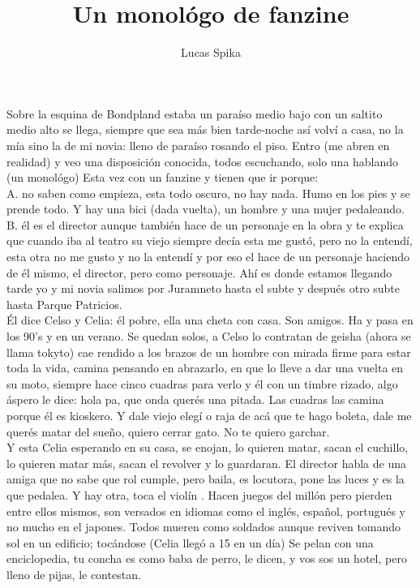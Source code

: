 \documentclass{article}
\title{Un monológo de fanzine}
\date{}
\author{Lucas Spika}
\begin{document}

Sobre la esquina de Bondpland estaba un paraíso medio bajo con un saltito medio alto se llega, siempre que sea más bien tarde-noche así volví a casa, no la mía sino la de mi novia: lleno de paraíso rosando el piso. Entro (me abren en realidad) y veo una disposición conocida, todos escuchando, solo una hablando (un monológo) Esta vez con un fanzine y tienen que ir porque:\\
A. no saben como empieza, esta todo oscuro, no hay nada. Humo  en los pies y se prende todo. Y hay una bici (dada vuelta), un hombre y una mujer pedaleando.\\
B. él es el director aunque también hace de un personaje en la obra y te explica que cuando iba al teatro su viejo siempre decía esta me gustó, pero no la entendí, esta otra no me gusto y no la entendí y por eso el hace de un personaje haciendo de él mismo, el director, pero como personaje. 
Ahí es donde estamos llegando tarde yo y mi novia salimos por Juramneto hasta el subte y después otro subte hasta Parque Patricios.
\\

Él dice Celso y Celia: él pobre, ella una cheta con casa. Son amigos. Ha y pasa en los 90’s y en un verano. Se quedan solos, a Celso lo contratan de geisha (ahora se llama tokyto) cae rendido a los brazos de un hombre con mirada firme para estar toda la vida, camina pensando en abrazarlo, en que lo lleve a dar una vuelta en su moto, siempre hace cinco cuadras para verlo y él con un timbre rizado, algo áspero le dice: hola pa, que onda querés una pitada. Las cuadras las camina porque él es  kioskero. Y dale viejo elegí o raja de acá que te hago boleta, dale me querés matar del sueño, quiero cerrar gato. No te quiero garchar. 
\\

Y esta Celia esperando en su casa, se enojan, lo quieren matar, sacan el cuchillo, lo quieren matar más, sacan el revolver y lo guardaran. El director habla de una amiga que no sabe que rol cumple, pero baila, es locutora, pone las luces y es la que pedalea. Y hay otra, toca el violín . Hacen juegos del millón pero pierden entre ellos mismos, son versados en idiomas como el inglés, español, portugués y no mucho en el japones. Todos mueren como soldados aunque reviven tomando sol en un edificio; tocándose (Celia llegó a 15 en un día) Se pelan con una enciclopedia, tu concha es como baba de perro, le dicen, y vos sos un hotel, pero lleno de pijas, le contestan.
\\
  
\end{document}

